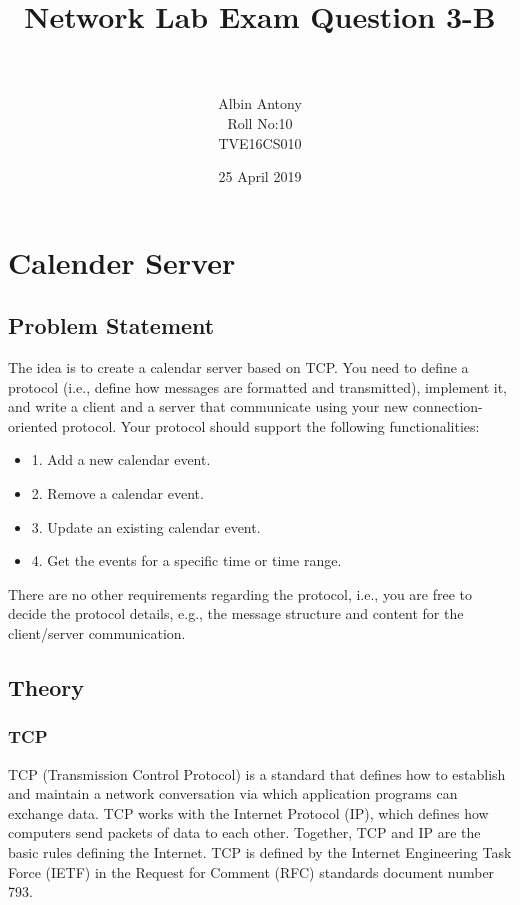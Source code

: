 \documentclass{article}
\title{\textbf{Network Lab Exam Question 3-B}}
\author{\\ \\  Albin Antony \\ Roll No:10 \\   TVE16CS010 }
\date{25 April 2019}
\begin{document}
  \maketitle
  \newpage
  \section{Calender Server}
  \subsection{Problem Statement}
 The idea is to create a calendar server based on TCP. You need to define a protocol (i.e.,
define how messages are formatted and transmitted), implement it, and write a client and a
server that communicate using your new connection-oriented protocol.
\newline
Your protocol should
support the following functionalities:
\begin{itemize}
\item1. Add a new calendar event.
\item2. Remove a calendar event.
\item3. Update an existing calendar event.
\item4. Get the events for a specific time or time range.
\end{itemize}

There are no other requirements regarding the protocol, i.e., you are free to decide the
protocol details, e.g., the message structure and content for the client/server communication.
  
  \subsection{Theory}
\subsubsection{TCP}
 TCP (Transmission Control Protocol) is a standard that defines how to establish and maintain a network conversation via which application programs can exchange data. TCP works with the Internet Protocol (IP), which defines how computers send packets of data to each other. Together, TCP and IP are the basic rules defining the Internet. TCP is defined by the Internet Engineering Task Force (IETF) in the Request for Comment (RFC) standards document number 793.
\end{document}
